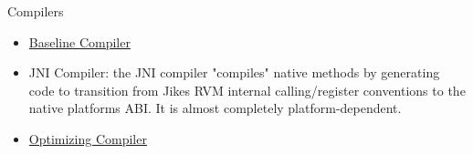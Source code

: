 \begin{chapter}{Compilers}
\label{cha:compilers}

\begin{itemize}
  \item \hyperref[sec:baselinecompiler]{Baseline Compiler}
  \item JNI Compiler: the JNI compiler "compiles" native methods by generating code to transition from Jikes RVM internal calling/register conventions to the native platforms ABI. It is almost completely platform-dependent.
  \item \hyperref[sec:optimizingcompiler]{Optimizing Compiler}
\end{itemize}













\end{chapter}
